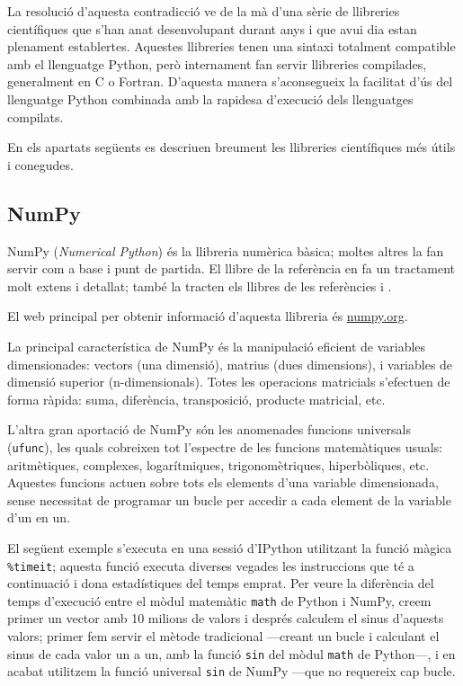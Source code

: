 La resolució d'aquesta  contradicció ve de la mà d'una sèrie de llibreries científiques que s'han anat desenvolupant durant anys i que avui dia estan plenament establertes. Aquestes llibreries tenen una sintaxi totalment compatible amb el llenguatge Python, però internament fan servir llibreries compilades, generalment en C o Fortran. D'aquesta manera s'aconsegueix la facilitat d'ús del llenguatge Python combinada amb la rapidesa d'execució dels llenguatges compilats.

En els apartats següents es descriuen breument  les llibreries científiques més útils i conegudes.

\subsection{NumPy}

NumPy  (\textit{Numerical Python}) és la llibreria numèrica bàsica; moltes altres la  fan servir com a base i punt de partida. El llibre de la referència \cite{VAN} en fa un tractament molt extens i detallat; també la tracten els llibres de les referències \cite{JOH} i \cite{HIL}.

El  web principal per obtenir informació d'aquesta llibreria és \href{https://numpy.org/}{numpy.org}.

La principal característica de NumPy és la manipulació eficient de variables dimensionades: vectors (una dimensió), matrius (dues dimensions), i variables de dimensió superior (n-dimensionals). Totes les operacions matricials s'efectuen de forma ràpida: suma, diferència, transposició, producte matricial, etc.

L'altra gran aportació de NumPy són les anomenades funcions universals (\texttt{ufunc}), les quals cobreixen tot l'espectre de les funcions matemàtiques usuals: aritmètiques, complexes, logarítmiques, trigonomètriques, hiperbòliques, etc. Aquestes funcions actuen sobre tots els elements d'una variable dimensionada, sense necessitat de programar un bucle per accedir a cada element de la variable d'un en un. 

El següent exemple s'executa en una sessió d'IPython utilitzant la funció màgica \texttt{\%timeit}; aquesta funció executa diverses vegades les instruccions que té a continuació i dona estadístiques del temps emprat. Per veure la diferència del temps d'execució entre el mòdul matemàtic \texttt{math} de Python  i NumPy, creem primer un vector amb 10 milions de valors i després calculem el sinus d'aquests valors; primer fem servir el mètode tradicional ---creant un bucle i calculant el sinus de cada valor un a un, amb la funció \texttt{sin} del mòdul \texttt{math} de Python---, i en acabat utilitzem la funció universal \texttt{sin} de NumPy ---que no requereix cap bucle.

